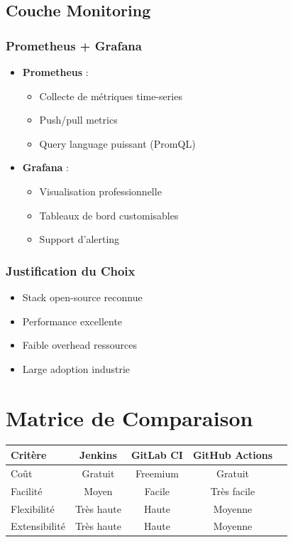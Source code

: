 \documentclass[12pt,a4paper]{report}
\begin{document}
\subsection{Couche Monitoring}

\subsubsection{Prometheus + Grafana}

\begin{itemize}
    \item \textbf{Prometheus} : 
    \begin{itemize}
        \item Collecte de métriques time-series
        \item Push/pull metrics
        \item Query language puissant (PromQL)
    \end{itemize}
    \item \textbf{Grafana} :
    \begin{itemize}
        \item Visualisation professionnelle
        \item Tableaux de bord customisables
        \item Support d'alerting
    \end{itemize}
\end{itemize}

\subsubsection{Justification du Choix}

\begin{itemize}
    \item Stack open-source reconnue
    \item Performance excellente
    \item Faible overhead ressources
    \item Large adoption industrie
\end{itemize}

\section{Matrice de Comparaison}

\begin{table}[h]
\centering
\begin{tabular}{|l|c|c|c|c|}
\hline
\textbf{Critère} & \textbf{Jenkins} & \textbf{GitLab CI} & \textbf{GitHub Actions} \\
\hline
Coût & Gratuit & Freemium & Gratuit \\
Facilité & Moyen & Facile & Très facile \\
Flexibilité & Très haute & Haute & Moyenne \\
Extensibilité & Très haute & Haute & Moyenne \\
\hline
\end{tabular}
\end{table}
\end{document}

